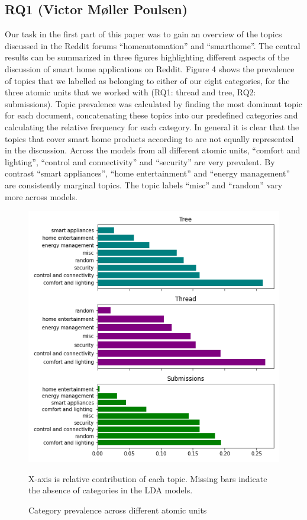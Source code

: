 \documentclass{article}
\begin{document}
    \subsection{RQ1 (Victor Møller Poulsen)}
    Our task in the first part of this paper was to gain an overview of the topics discussed in the Reddit forums “homeautomation” and “smarthome”. The central results can be summarized in three figures highlighting different aspects of the discussion of smart home applications on Reddit. Figure 4 shows the prevalence of topics that we labelled as belonging to either of our eight categories, for the three atomic units that we worked with (RQ1: thread and tree, RQ2: submissions). Topic prevalence was calculated by finding the most dominant topic for each document, concatenating these topics into our predefined categories and calculating the relative frequency for each category. In general it is clear that the topics that cover smart home products according to  are not equally represented in the discussion. Across the models from all different atomic units, “comfort and lighting”, “control and connectivity” and “security” are very prevalent. By contrast “smart appliances”, “home entertainment” and “energy management” are consistently marginal topics. The topic labels “misc” and “random” vary more across models. 
    
    \begin{figure}[H]
        \begin{centering}
        \includegraphics[width = \textwidth]{../Figure/Topic_Prevalence.png}
        \caption{Category prevalence across different atomic units}
        \end{centering}
        \begin{footnotesize} 
            X-axis is relative contribution of each topic. Missing bars indicate the absence of categories in the LDA models. 
        \end{footnotesize}
    \end{figure}
    
\end{document}
